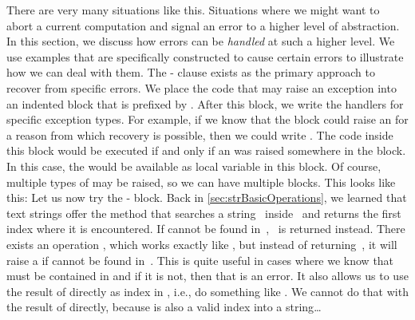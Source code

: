 There are very many situations like this.
Situations where we might want to abort a current computation and signal an error to a higher level of abstraction.
In this section, we discuss how errors can be \emph{handled} at such a higher level.
We use examples that are specifically constructed to cause certain errors to illustrate how we can deal with them.%
%
%
%
The \nobreakdashes- clause exists as the primary approach to recover from specific errors.
We place the code that may raise an exception into an indented block that is prefixed by .
After this block, we write the handlers for specific exception types.
For example, if we know that the  block could raise an  for a reason from which recovery is possible, then we could write .
The code inside this  block would be executed if and only if an  was raised somewhere in the  block.
In this case, the  would be available as local variable  in this block.
Of course, multiple types of  may be raised, so we can have multiple  blocks.
This looks like this:%
%
%
\FloatBarrier%
%
%
%
%
Let us now try the - block.
Back in \cref{sec:strBasicOperations}, we learned that text strings offer the method  that searches a string~ inside~ and returns the first index where it is encountered.
If  cannot be found in~, ~is returned instead.
There exists an operation , which works exactly like , but instead of returning~, it will raise a  if  cannot be found in~.
This is quite useful in cases where we know that  must be contained in  and if it is not, then that is an error.
It also allows us to use the result of  directly as index in , i.e., do something like .
We cannot do that with the result of  directly, because  is also a valid index into a string{\dots}

